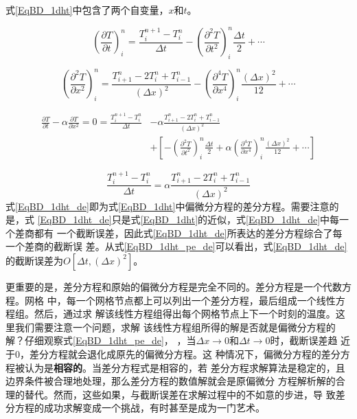 式\eqref{EqBD_1dht}中包含了两个自变量，$x$和$t$。

\begin{equation}
  \left(
    \frac{\partial T}{\partial t}
  \right)_{i}^{n}
  =
  \frac{T_{i}^{n+1}-T_{i}^{n}}{\Delta t}
  -
  \left(
    \frac{\partial^{2} T}{\partial t^{2}}
  \right)_{i}^{n}
  \frac{\Delta t}{2}
  +
  \cdots
\end{equation}

\begin{equation}
  \left(
    \frac{\partial^{2} T}{\partial x^{2}}
  \right)_{i}^{n}
  =
  \frac{T_{i+1}^{n}-2T_{i}^{n}+T_{i-1}^{n}}{(\Delta x)^2}
  -
  \left(
    \frac{\partial^{4} T}{\partial x^{4}}
  \right)_{i}^{n}
  \frac{(\Delta x)^{2}}{12}
  +
  \cdots
\end{equation}

\begin{equation}
  \begin{aligned}
    \frac{\partial T}{\partial t}
    -
    \alpha
    \frac{\partial T}{\partial x^{2}}
    =
    0
    =
    \frac{T_{i}^{n+1}-T_{i}^{n}}{\Delta t}
    &-
    \alpha\frac{T_{i+1}^{n}-2T_{i}^{n}+T_{i-1}^{n}}{(\Delta x)^2}
    \\
    &+
    \left[
      -
      \left(
        \frac{\partial^{2} T}{\partial t^{2}}
      \right)_{i}^{n}
      \frac{\Delta t}{2}
      +
      \alpha
      \left(
        \frac{\partial^{4} T}{\partial x^{4}}
      \right)_{i}^{n}
      \frac{(\Delta x)^{2}}{12}
      +
      \cdots
    \right]
  \end{aligned}
  \label{EqBD_1dht_pe_de}
\end{equation}

\begin{equation}
    \frac{T_{i}^{n+1}-T_{i}^{n}}{\Delta t}
    =
    \alpha\frac{T_{i+1}^{n}-2T_{i}^{n}+T_{i-1}^{n}}{(\Delta x)^2}
    \label{EqBD_1dht_de}
\end{equation}
式\eqref{EqBD_1dht_de}即为式\eqref{EqBD_1dht}中偏微分方程的差分方程。需要注意的是，式
\eqref{EqBD_1dht_de}只是式\eqref{EqBD_1dht}的近似，式\eqref{EqBD_1dht_de}中每一个差商都有
一个截断误差，因此式\eqref{EqBD_1dht_de}所表达的差分方程综合了每一个差商的截断误
差。从式\eqref{EqBD_1dht_pe_de}可以看出，式\eqref{EqBD_1dht_de}的截断误差为$O[\Delta t, (\Delta
x)^{2}]$。

更重要的是，差分方程和原始的偏微分方程是完全不同的。差分方程是一个代数方程。网格
中，每一个网格节点都上可以列出一个差分方程，最后组成一个线性方程组。然后，通过求
解该线性方程组得出每个网格节点上下一个时刻的温度。这里我们需要注意一个问题，求解
该线性方程组所得的解是否就是偏微分方程的解？仔细观察式\eqref{EqBD_1dht_pe_de}，
，当$\Delta x \rightarrow 0$和$\Delta t \rightarrow 0$时，截断误差趋
近于0，差分方程就会退化成原先的偏微分方程。这
种情况下，偏微分方程的差分方程被认为是\textbf{相容的}。当差分方程式是相容的，若
差分方程求解算法是稳定的，且边界条件被合理地处理，那么差分方程的数值解就会是原偏微分
方程解析解的合理的替代。然而，这些如果，与截断误差在求解过程中的不如意的步进，导
致差分方程的成功求解变成一个挑战，有时甚至是成为一门艺术。

